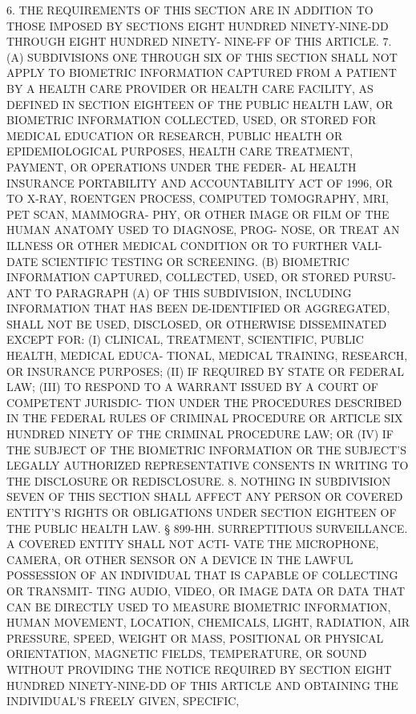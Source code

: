    6. THE REQUIREMENTS OF THIS SECTION ARE IN ADDITION TO  THOSE  IMPOSED
 BY  SECTIONS  EIGHT HUNDRED NINETY-NINE-DD THROUGH EIGHT HUNDRED NINETY-
 NINE-FF OF THIS ARTICLE.
   7. (A) SUBDIVISIONS ONE THROUGH SIX OF THIS SECTION SHALL NOT APPLY TO
 BIOMETRIC  INFORMATION CAPTURED FROM A PATIENT BY A HEALTH CARE PROVIDER
 OR HEALTH CARE FACILITY, AS DEFINED IN SECTION EIGHTEEN  OF  THE  PUBLIC
 HEALTH  LAW,  OR  BIOMETRIC  INFORMATION  COLLECTED, USED, OR STORED FOR
 MEDICAL  EDUCATION  OR  RESEARCH,  PUBLIC  HEALTH   OR   EPIDEMIOLOGICAL
 PURPOSES, HEALTH CARE TREATMENT, PAYMENT, OR OPERATIONS UNDER THE FEDER-
 AL  HEALTH  INSURANCE  PORTABILITY AND ACCOUNTABILITY ACT OF 1996, OR TO
 X-RAY, ROENTGEN PROCESS, COMPUTED TOMOGRAPHY, MRI, PET  SCAN,  MAMMOGRA-
 PHY, OR OTHER IMAGE OR FILM OF THE HUMAN ANATOMY USED TO DIAGNOSE, PROG-
 NOSE, OR TREAT AN ILLNESS OR OTHER MEDICAL CONDITION OR TO FURTHER VALI-
 DATE SCIENTIFIC TESTING OR SCREENING.
   (B)  BIOMETRIC INFORMATION CAPTURED, COLLECTED, USED, OR STORED PURSU-
 ANT TO PARAGRAPH (A) OF THIS SUBDIVISION, INCLUDING INFORMATION THAT HAS
 BEEN DE-IDENTIFIED OR AGGREGATED,  SHALL  NOT  BE  USED,  DISCLOSED,  OR
 OTHERWISE DISSEMINATED EXCEPT FOR:
   (I)  CLINICAL,  TREATMENT,  SCIENTIFIC,  PUBLIC HEALTH, MEDICAL EDUCA-
 TIONAL, MEDICAL TRAINING, RESEARCH, OR INSURANCE PURPOSES;
   (II) IF REQUIRED BY STATE OR FEDERAL LAW;
   (III) TO RESPOND TO A WARRANT ISSUED BY A COURT OF COMPETENT JURISDIC-
 TION UNDER THE PROCEDURES DESCRIBED IN THE  FEDERAL  RULES  OF  CRIMINAL
 PROCEDURE  OR  ARTICLE SIX HUNDRED NINETY OF THE CRIMINAL PROCEDURE LAW;
 OR
   (IV) IF THE SUBJECT OF THE  BIOMETRIC  INFORMATION  OR  THE  SUBJECT'S
 LEGALLY  AUTHORIZED REPRESENTATIVE CONSENTS IN WRITING TO THE DISCLOSURE
 OR REDISCLOSURE.
   8. NOTHING IN SUBDIVISION SEVEN  OF  THIS  SECTION  SHALL  AFFECT  ANY
 PERSON  OR COVERED ENTITY'S RIGHTS OR OBLIGATIONS UNDER SECTION EIGHTEEN
 OF THE PUBLIC HEALTH LAW.
   § 899-HH. SURREPTITIOUS SURVEILLANCE. A COVERED ENTITY SHALL NOT ACTI-
 VATE THE MICROPHONE, CAMERA, OR OTHER SENSOR ON A DEVICE IN  THE  LAWFUL
 POSSESSION  OF  AN INDIVIDUAL THAT IS CAPABLE OF COLLECTING OR TRANSMIT-
 TING AUDIO, VIDEO, OR IMAGE DATA OR DATA THAT CAN BE  DIRECTLY  USED  TO
 MEASURE  BIOMETRIC  INFORMATION,  HUMAN  MOVEMENT,  LOCATION, CHEMICALS,
 LIGHT, RADIATION, AIR PRESSURE, SPEED, WEIGHT  OR  MASS,  POSITIONAL  OR
 PHYSICAL  ORIENTATION,  MAGNETIC  FIELDS,  TEMPERATURE, OR SOUND WITHOUT
 PROVIDING THE NOTICE REQUIRED BY SECTION EIGHT HUNDRED NINETY-NINE-DD OF
 THIS ARTICLE AND OBTAINING  THE  INDIVIDUAL'S  FREELY  GIVEN,  SPECIFIC,
